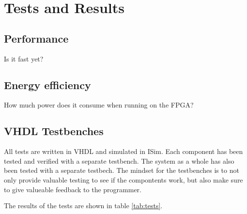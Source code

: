 \section{Tests and Results}


\subsection{Performance}

Is it fast yet?

\subsection{Energy efficiency}

How much power does it consume when running on the FPGA?

\subsection{VHDL Testbenches}

All tests are written in VHDL and simulated in ISim.
Each component has been tested and verified with a separate testbench.
The system as a whole has also been tested with a separate testbech.
The mindset for the testbenches is to not only provide valuable testing to see if the compontents work,
but also make sure to give valueable feedback to the programmer.

The results of the tests are shown in table \ref{tab:tests}.

